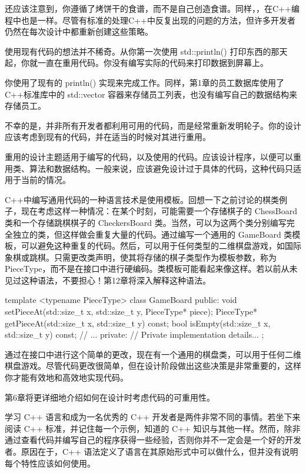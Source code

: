 还应该注意到，你遵循了烤饼干的食谱，而不是自己创造食谱。同样，，在C++编程中也是一样。尽管有标准的处理C++中反复出现的问题的方法，但许多开发者仍然在每次设计中都重新创建这些策略。

使用现有代码的想法并不稀奇。从你第一次使用 std::println() 打印东西的那天起，你就一直在重用代码。你没有编写实际的代码来打印数据到屏幕上。

你使用了现有的 println() 实现来完成工作。同样，第1章的员工数据库使用了C++标准库中的 std::vector 容器来存储员工列表，也没有编写自己的数据结构来存储员工。

不幸的是，并非所有开发者都利用可用的代码，而是经常重新发明轮子。你的设计应该考虑到现有的代码，并在适当的时候对其进行重用。


重用的设计主题适用于编写的代码，以及使用的代码。应该设计程序，以便可以重用类、算法和数据结构。一般来说，应该避免设计过于具体的代码，这种代码只适用于当前的情况。

C++中编写通用代码的一种语言技术是使用模板。回想一下之前讨论的棋类例子，现在考虑这样一种情况：在某个时刻，可能需要一个存储棋子的 ChessBoard 类和一个存储跳棋棋子的 CheckersBoard 类。当然，可以为这两个类分别编写完全独立的类，但这样做会重复大量的代码。通过编写一个通用的 GameBoard 类模板，可以避免这种重复的代码。然后，可以用于任何类型的二维棋盘游戏，如国际象棋或跳棋。只需更改类声明，使其将存储的棋子类型作为模板参数，称为 PieceType，而不是在接口中进行硬编码。类模板可能看起来像这样。若以前从未见过这种语法，不要担心！第12章将深入解释这种语法。

\begin{cpp}
template <typename PieceType>
class GameBoard
{
    public:
        void setPieceAt(std::size_t x, std::size_t y, PieceType* piece);
        PieceType* getPieceAt(std::size_t x, std::size_t y) const;
        bool isEmpty(std::size_t x, std::size_t y) const;
        // ...
    private:
        // Private implementation details...
};
\end{cpp}

通过在接口中进行这个简单的更改，现在有一个通用的棋盘类，可以用于任何二维棋盘游戏。尽管代码更改很简单，但在设计阶段做出这些决策是非常重要的，这样你才能有效地和高效地实现代码。

第6章将更详细地介绍如何在设计时考虑代码的可重用性。


学习 C++ 语言和成为一名优秀的 C++ 开发者是两件非常不同的事情。若坐下来阅读 C++ 标准，并记住每一个示例，知道的 C++ 知识与其他一样。然而，除非通过查看代码并编写自己的程序获得一些经验，否则你并不一定会是一个好的开发者。原因在于，C++ 语法定义了语言在其原始形式中可以做什么，但并没有说明每个特性应该如何使用。

